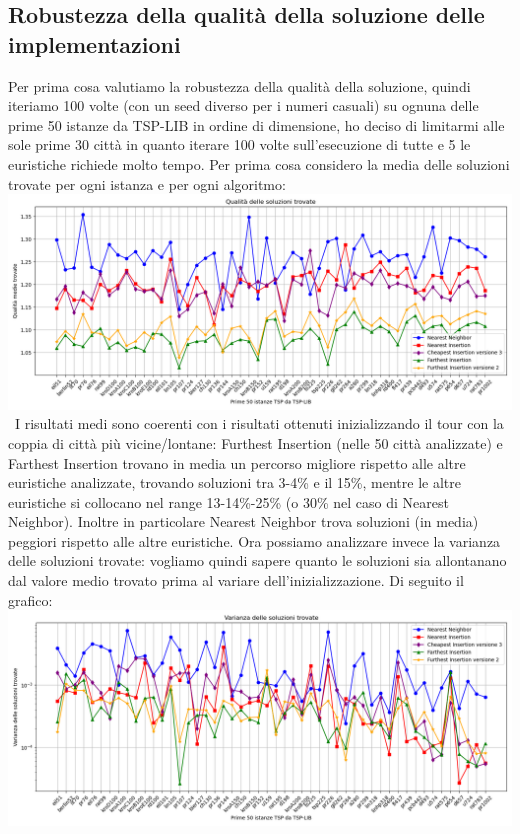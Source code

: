 \documentclass[a4paper,12pt]{report}
\begin{document}
\subsection{Robustezza della qualità della soluzione delle implementazioni}
Per prima cosa valutiamo la robustezza della qualità della soluzione, quindi iteriamo 100 volte (con un seed diverso per i numeri casuali) su ognuna delle prime 50 istanze da TSP-LIB in ordine di dimensione, ho deciso di limitarmi alle sole prime 30 città in quanto iterare 100 volte sull'esecuzione di tutte e 5 le euristiche richiede molto tempo. Per prima cosa considero la media delle soluzioni trovate per ogni istanza e per ogni algoritmo: \newline
\includegraphics[width=1\textwidth]{../Grafici/9.png} \
I risultati medi sono coerenti con i risultati ottenuti inizializzando il tour con la coppia di città più vicine/lontane: Furthest Insertion (nelle 50 città analizzate) e Farthest Insertion trovano in media un percorso migliore rispetto alle altre euristiche analizzate, trovando soluzioni tra 3-4\% e il 15\%, mentre le altre euristiche si collocano nel range 13-14\%-25\% (o 30\% nel caso di Nearest Neighbor). Inoltre in particolare Nearest Neighbor trova soluzioni (in media) peggiori rispetto alle altre euristiche. \newline 
Ora possiamo analizzare invece la varianza delle soluzioni trovate: vogliamo quindi sapere quanto le soluzioni sia allontanano dal valore medio trovato prima al variare dell'inizializzazione. Di seguito il grafico: \newline
\includegraphics[width=1\textwidth]{../Grafici/10.png} \
\end{document}
